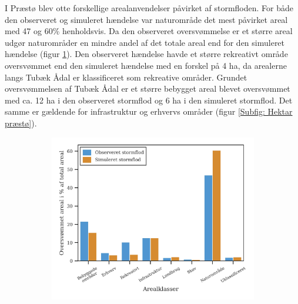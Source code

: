 I Præstø blev otte forskellige arealanvendelser påvirket af stormfloden. For både den observeret og simuleret hændelse var naturområde det mest påvirket areal med 47 og 60\% henholdsvis. Da den observeret oversvømmelse er et større areal udgør naturområder en mindre andel af det totale areal end for den simuleret hændelse (figur \ref{Subfig: Procent præstø}). Den observeret hændelse havde et større rekreativt område oversvømmet end den simuleret hændelse med en forskel på 4 ha, da arealerne langs Tubæk Ådal er klassificeret som rekreative områder. Grundet oversvømmelsen af Tubæk Ådal er et større bebygget areal blevet oversvømmet med ca. 12 ha i den observeret stormflod og 6 ha i den simuleret stormflod. Det samme er gældende for infrastruktur og erhvervs områder (figur \ref{Subfig: Hektar præstø}).
\begin{figure}[H]
    \begin{subfigure}[b]{0.5\textwidth}
        \centering
        \includegraphics[width=1\linewidth]{images/Resultater/areal_anvendelses_grafer/praestoe_arealanvendelse.jpg}
        \caption{}
        \label{Subfig: Procent præstø}
    \end{subfigure}
    \begin{subfigure}[b]{0.5\textwidth}
        \centering

\end{subfigure}
\end{figure}
